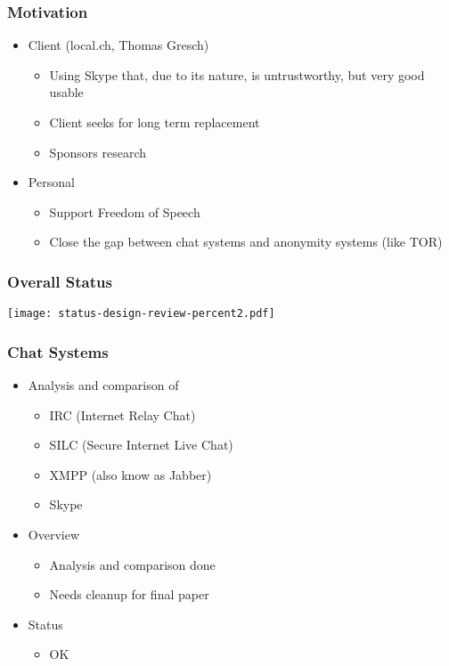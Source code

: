 \documentclass{beamer}
\begin{document}
\frame
{
  \frametitle{Motivation}
  \begin{itemize}
     \item Client (local.ch, Thomas Gresch)
     \begin{itemize}
        \item Using Skype that, due to its nature, is untrustworthy, but very good usable
        \item Client seeks for long term replacement 
        \item Sponsors research
    \end{itemize}
     \item Personal
     \begin{itemize}
        \item Support Freedom of Speech
        \item Close the gap between chat systems and anonymity systems (like TOR)
    \end{itemize}
  \end{itemize}
}

\frame
{
  \frametitle{Overall Status}
  
  \begin{center}
   \texttt{[image: status-design-review-percent2.pdf]}
  \end{center}
}


\frame
{
  \frametitle{Chat Systems}
  \begin{itemize}
      \item Analysis and comparison of
      \begin{itemize}
          \item IRC (Internet Relay Chat)
          \item SILC (Secure Internet Live Chat)
          \item XMPP (also know as Jabber)
          \item Skype
      \end{itemize}
      \item Overview
      \begin{itemize}
          \item Analysis and comparison done
          \item Needs cleanup for final paper
      \end{itemize}
      \item Status
      \begin{itemize}
          \item OK
      \end{itemize}
  \end{itemize}
}
\end{document}
